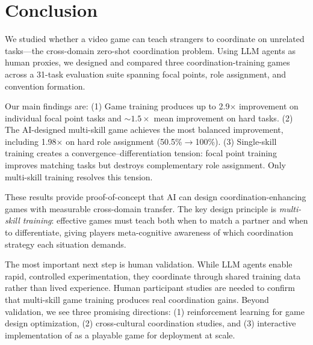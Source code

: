 \section{Conclusion}
\label{sec:conclusion}

We studied whether a video game can teach strangers to coordinate on unrelated tasks---the cross-domain zero-shot coordination problem.
Using LLM agents as human proxies, we designed and compared three coordination-training games across a 31-task evaluation suite spanning focal points, role assignment, and convention formation.

Our main findings are:
(1) Game training produces up to 2.9$\times$ improvement on individual focal point tasks and ${\sim}1.5\times$ mean improvement on hard tasks.
(2) The AI-designed multi-skill game \syncminds achieves the most balanced improvement, including 1.98$\times$ on hard role assignment (50.5\%$\to$100\%).
(3) Single-skill training creates a convergence--differentiation tension: focal point training improves matching tasks but destroys complementary role assignment.
Only multi-skill training resolves this tension.

These results provide proof-of-concept that AI can design coordination-enhancing games with measurable cross-domain transfer.
The key design principle is \emph{multi-skill training}: effective games must teach both when to match a partner and when to differentiate, giving players meta-cognitive awareness of which coordination strategy each situation demands.

The most important next step is human validation.
While LLM agents enable rapid, controlled experimentation, they coordinate through shared training data rather than lived experience.
Human participant studies are needed to confirm that multi-skill game training produces real coordination gains.
Beyond validation, we see three promising directions: (1) reinforcement learning for game design optimization, (2) cross-cultural coordination studies, and (3) interactive implementation of \syncminds as a playable game for deployment at scale.
